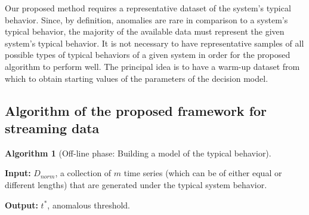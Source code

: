\documentclass[12pt]{article}
\begin{document}
Our proposed method requires a representative dataset of the system's
typical behavior. Since, by definition, anomalies are rare in comparison
to a system's typical behavior, the majority of the available data must
represent the given system's typical behavior. It is not necessary to
have representative samples of all possible types of typical behaviors
of a given system in order for the proposed algorithm to perform well.
The principal idea is to have a warm-up dataset from which to obtain
starting values of the parameters of the decision model.

\hypertarget{algorithm-of-the-proposed-framework-for-streaming-data}{%
\subsection{Algorithm of the proposed framework for streaming
data}\label{algorithm-of-the-proposed-framework-for-streaming-data}}

\label{sec:algorithm1}

\newtheorem{algo}{Algorithm}
\begin{algo}[Off-line phase: Building a model of the typical behavior] {\label{alg:algorithm-off}}
\end{algo}

\vspace{-0.5em}

\textbf{Input:} \(D_{norm}\), a collection of \(m\) time series (which
can be of either equal or different lengths) that are generated under
the typical system behavior.

\textbf{Output:} \(t^{*}\), anomalous threshold.

\vspace{-0.5em}
\end{document}
